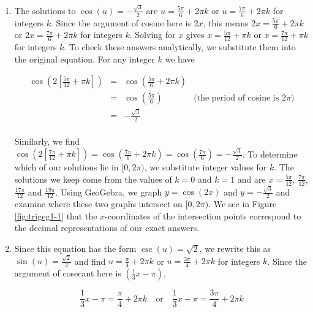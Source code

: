 {
\begin{enumerate}

\item  The solutions to $\cos(u) =-\frac{\sqrt{3}}{2}$ are $u = \frac{5\pi}{6} + 2\pi k$ or $u = \frac{7\pi}{6} + 2\pi k$ for integers $k$.  Since the argument of cosine here is $2x$, this means $2x = \frac{5\pi}{6} + 2\pi k$ or $2x = \frac{7\pi}{6} + 2\pi k$ for integers $k$.  Solving for $x$ gives $x = \frac{5\pi}{12} + \pi k$ or $x = \frac{7\pi}{12} + \pi k$ for integers $k$.  To check these answers analytically, we substitute them into the original equation.  For any integer $k$ we have

\[ \begin{array}{rclr}

\cos\left( 2\left[\frac{5\pi}{12} + \pi k\right]\right) &  = &  \cos\left(\frac{5\pi}{6} + 2\pi k\right) & \\ [3pt]
																												& =  &   \cos\left(\frac{5\pi}{6}\right) & \text{(the period of cosine is $2\pi$)} \\ [3pt]
																												& =  & -\frac{\sqrt{3}}{2} & \\
\end{array}\] 

Similarly, we find $\cos\left( 2\left[\frac{7\pi}{12} + \pi k\right]\right) = \cos\left(\frac{7\pi}{6} + 2\pi k\right) = \cos\left(\frac{7\pi}{6}\right) = -\frac{\sqrt{3}}{2}$.  To determine which of our solutions lie in $[0,2\pi)$, we substitute integer values for $k$.  The solutions we keep come from the values of $k = 0$ and $k =1$ and are  $x = \frac{5\pi}{12}$,  $\frac{7\pi}{12}$, $\frac{17\pi}{12}$ and $\frac{19\pi}{12}$.  Using GeoGebra, we graph $y = \cos(2x)$ and $y = -\frac{\sqrt{3}}{2}$ and examine where these two graphs intersect on $[0,2\pi)$.  We see in Figure \ref{fig:trigeg1-1} that the $x$-coordinates of the intersection points correspond to the decimal representations of our exact answers.


\item  Since this equation has the form $\csc(u) = \sqrt{2}$, we rewrite this as $\sin(u) = \frac{\sqrt{2}}{2}$ and find $u = \frac{\pi}{4} + 2\pi k$ or $u = \frac{3\pi}{4} + 2\pi  k$ for integers $k$.  Since the argument of cosecant here is $\left(\frac{1}{3}x-\pi \right)$,

\[ \frac{1}{3}x-\pi = \frac{\pi}{4} + 2\pi k \quad \text{or} \quad  \frac{1}{3}x-\pi = \frac{3\pi}{4} + 2\pi k\]


\end{enumerate}}
